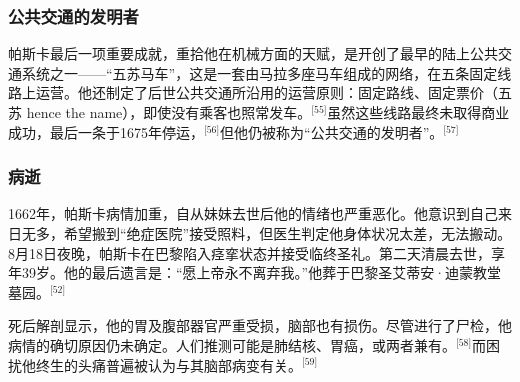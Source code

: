 \subsubsection{公共交通的发明者}
帕斯卡最后一项重要成就，重拾他在机械方面的天赋，是开创了最早的陆上公共交通系统之一——“五苏马车”，这是一套由马拉多座马车组成的网络，在五条固定线路上运营。他还制定了后世公共交通所沿用的运营原则：固定路线、固定票价（五苏 hence the name），即使没有乘客也照常发车。\(^\text{[55]}\)虽然这些线路最终未取得商业成功，最后一条于1675年停运，\(^\text{[56]}\)但他仍被称为“公共交通的发明者”。\(^\text{[57]}\)
\subsubsection{病逝}
1662年，帕斯卡病情加重，自从妹妹去世后他的情绪也严重恶化。他意识到自己来日无多，希望搬到“绝症医院”接受照料，但医生判定他身体状况太差，无法搬动。8月18日夜晚，帕斯卡在巴黎陷入痉挛状态并接受临终圣礼。第二天清晨去世，享年39岁。他的最后遗言是：“愿上帝永不离弃我。”他葬于巴黎圣艾蒂安·迪蒙教堂墓园。\(^\text{[52]}\)

死后解剖显示，他的胃及腹部器官严重受损，脑部也有损伤。尽管进行了尸检，他病情的确切原因仍未确定。人们推测可能是肺结核、胃癌，或两者兼有。\(^\text{[58]}\)而困扰他终生的头痛普遍被认为与其脑部病变有关。\(^\text{[59]}\)
